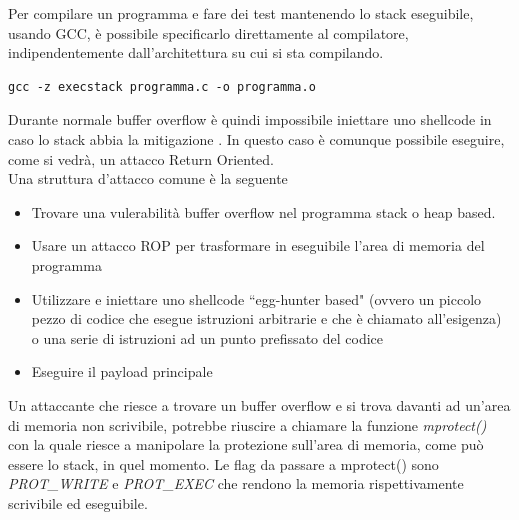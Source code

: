 Per compilare un programma e fare dei test mantenendo lo stack eseguibile, usando GCC, è possibile specificarlo direttamente al compilatore, indipendentemente dall'architettura su cui si sta compilando.
\begin{verbatim}
gcc -z execstack programma.c -o programma.o
\end{verbatim}
Durante normale buffer overflow è quindi impossibile iniettare uno shellcode in caso lo stack abbia la mitigazione . In questo caso è comunque possibile eseguire, come si vedrà, un attacco Return Oriented.\\
Una struttura d'attacco comune è la seguente
\begin{itemize}
    \item Trovare una vulerabilità buffer overflow nel programma stack o heap based.
    \item Usare un attacco ROP per trasformare in eseguibile l'area di memoria del programma 
    \item Utilizzare e iniettare uno shellcode ``egg-hunter based" \cite{coalfire} (ovvero un piccolo pezzo di codice che esegue istruzioni arbitrarie e che è chiamato all'esigenza) o una serie di istruzioni ad un punto prefissato del codice
    \item Eseguire il payload principale
\end{itemize}
Un attaccante che riesce a trovare un buffer overflow e si trova davanti ad un'area di memoria non scrivibile, potrebbe riuscire a chiamare la funzione \textit{mprotect()} \cite{man7} con la quale riesce a manipolare la protezione sull'area di memoria, come può essere lo stack, in quel momento. Le flag da passare a mprotect() sono \textit{PROT\_WRITE} e \textit{PROT\_EXEC} che rendono la memoria rispettivamente scrivibile ed eseguibile.
